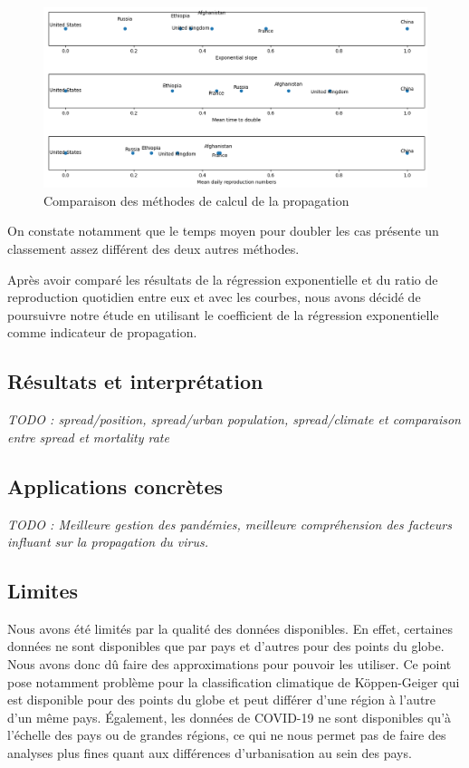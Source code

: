 \documentclass[12pt]{iEEEtran}
\begin{document}
\begin{figure}[h]
    \centering
    \includegraphics[width=\columnwidth]{img/spread_comp.png}
    \caption{Comparaison des méthodes de calcul de la propagation}

    \label{fig:spread_comp}
\end{figure}

On constate notamment que le temps moyen pour doubler les cas présente un classement assez
différent des deux autres méthodes.

Après avoir comparé les résultats de la régression exponentielle et du ratio de reproduction
quotidien entre eux et avec les courbes, nous avons décidé de poursuivre notre étude en
utilisant le coefficient de la régression exponentielle comme indicateur de propagation.

\subsection{Résultats et interprétation}
\textit{TODO : spread/position, spread/urban population, spread/climate et comparaison entre
spread et mortality rate}

\subsection{Applications concrètes}
\textit{TODO : Meilleure gestion des pandémies, meilleure compréhension des facteurs
influant sur la propagation du virus.}
\subsection{Limites}
Nous avons été limités par la qualité des données disponibles. En effet, certaines données
ne sont disponibles que par pays et d'autres pour des points du globe. Nous avons donc dû
faire des approximations pour pouvoir les utiliser. Ce point pose notamment problème pour
la classification climatique de Köppen-Geiger qui est disponible pour des points du globe et
peut différer d'une région à l'autre d'un même pays. Également, les données de COVID-19
ne sont disponibles qu'à l'échelle des pays ou de grandes régions, ce qui ne nous permet
pas de faire des analyses plus fines quant aux différences d'urbanisation au sein des pays.
\end{document}
